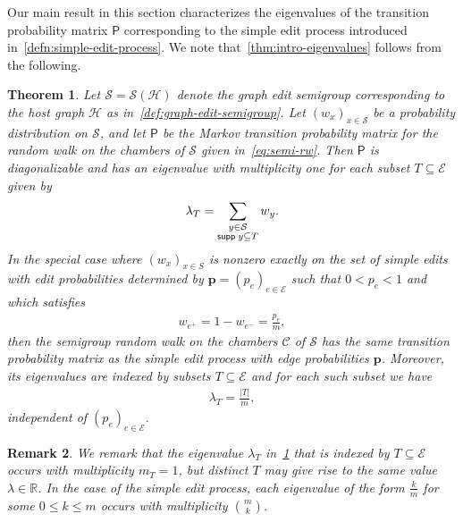 \documentclass[11pt,a4paper]{article}
\newcommand{\supp}{{\mathsf{supp }\hspace{.075cm}}}
\newtheorem{theorem}{Theorem}[section]
\newtheorem{remark}[theorem]{Remark}
\begin{document}
Our main result in this section characterizes the eigenvalues of the transition probability matrix $\mathsf{P}$ corresponding to the simple edit process introduced in~\cref{defn:simple-edit-process}. We note that~\cref{thm:intro-eigenvalues} follows from the following.

\begin{theorem}\label{thm:eigenvalues-state-graph}
    Let $\mathcal{S} = \mathcal{S}(\mathcal{H})$ denote the graph edit semigroup corresponding to the host graph $\mathcal{H}$ as in~\cref{def:graph-edit-semigroup}. Let $(w_x)_{x\in \mathcal{S}}$ be a probability distribution on $\mathcal{S}$, and let $\mathsf{P}$ be the Markov transition probability matrix for the random walk on the chambers of $\mathcal{S}$ given in~\cref{eq:semi-rw}. Then $\mathsf{P}$ is diagonalizable and has an eigenvalue with multiplicity one for each subset $T\subseteq {\mathcal{E}}$ given by
        \begin{align}\label{eq:eigenvalue-01}
            \lambda_T = \sum_{\substack{y\in \mathcal{S} \\\supp{y} \subseteq T}} w_y.
        \end{align}
    In the special case where $(w_x)_{x\in S}$ is nonzero exactly on the set of simple edits with edit probabilities determined by $\mathbf{p} = (p_e)_{e\in\mathcal{E}}$ such that $0<p_e<1$ and which satisfies
        \begin{align*}
            w_{e^+} = 1 - w_{e^-} = \frac{p_e}{{m}},
        \end{align*}
    then the semigroup random walk on the chambers $\mathcal{C}$ of $\mathcal{S}$ has the same transition probability matrix as the simple edit process with edge probabilities $\mathbf{p}$. Moreover, its eigenvalues are indexed by subsets $T\subseteq\mathcal{E}$ and for each such subset we have
        \begin{align}\label{eq:lambda-T}
            \lambda_T = \frac{|T|}{{m}},
        \end{align}
    independent of $(p_e)_{e\in\mathcal{E}}$.
\end{theorem}

\begin{remark}\label{rmk:multiplicities}
    We remark that the eigenvalue $\lambda_T$ in~\cref{thm:eigenvalues-state-graph} that is \textit{indexed by} $T\subseteq\mathcal{E}$ occurs with multiplicity $m_T=1$, but distinct $T$ may give rise to the same value $\lambda\in\mathbb{R}$. In the case of the simple edit process, each eigenvalue of the form $\frac{k}{{m}}$ for some $0\leq k\leq m$ occurs with multiplicity ${{m}\choose k}$.
\end{remark}
\end{document}
